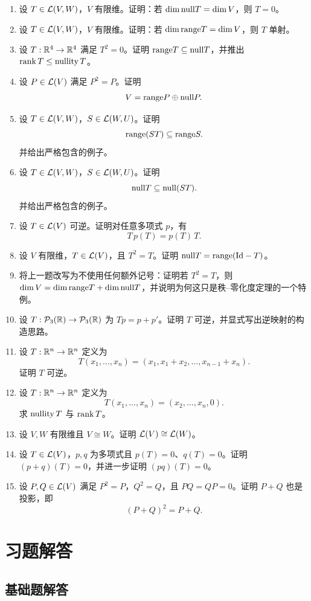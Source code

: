 \begin{enumerate}[label=\hard\ \arabic*., leftmargin=*, start=1] \item 设
$T\in\mathcal{L}(V,W)$，$V$ 有限维。证明：若 $\dim \mathrm{null} T=\dim V$，则 $T=0$。 \item 设 $T\in\mathcal{L}(V,W)$，$V$
有限维。证明：若 $\dim \mathrm{range} T=\dim V$，则 $T$ 单射。 \item 设 $T:\mathbb{R}^4\to\mathbb{R}^4$ 满足 $T^2=0$。证明 $\mathrm{range}
T\subseteq \mathrm{null} T$，并推出 $\operatorname{rank} T\leq \operatorname{nullity} T$。 \item 设 $P\in\mathcal{L}(V)$ 满足 $P^2=P$。证明 \[
V=\mathrm{range} P\oplus \mathrm{null} P. \] \item 设 $T\in\mathcal{L}(V,W)$，$S\in\mathcal{L}(W,U)$。证明 \[
\mathrm{range}(ST)\subseteq \mathrm{range} S. \] 并给出严格包含的例子。 \item 设
$T\in\mathcal{L}(V,W)$，$S\in\mathcal{L}(W,U)$。证明 \[ \mathrm{null} T\subseteq \mathrm{null}(ST). \] 并给出严格包含的例子。 \item 设
$T\in\mathcal{L}(V)$ 可逆。证明对任意多项式 $p$，有 \[ T\,p(T)=p(T)\,T. \] \item 设 $V$ 有限维，$T\in\mathcal{L}(V)$，且
$T^2=T$。证明 $\mathrm{null} T=\mathrm{range}(\mathrm{Id}-T)$。 \item 将上一题改写为不使用任何额外记号：证明若 $T^2=T$，则 $\dim V=\dim
\mathrm{range} T+\dim \mathrm{null} T$，并说明为何这只是秩--零化度定理的一个特例。 \item 设 $T:\mathcal{P}_3(\mathbb{R})\to\mathcal{P}_3(\mathbb{R})$ 为
$Tp=p+p'$。证明 $T$ 可逆，并显式写出逆映射的构造思路。 \item 设 $T:\mathbb{R}^n\to\mathbb{R}^n$ 定义为 \[
T(x_1,\dots,x_n)=(x_1,x_1+x_2,\dots,x_{n-1}+x_n). \] 证明 $T$ 可逆。 \item 设 $T:\mathbb{R}^n\to\mathbb{R}^n$
定义为 \[ T(x_1,\dots,x_n)=(x_2,\dots,x_n,0). \] 求 $\operatorname{nullity} T$ 与 $\operatorname{rank} T$。 \item 设 $V,W$
有限维且 $V\cong W$。证明 $\mathcal{L}(V)\cong \mathcal{L}(W)$。 \item 设 $T\in\mathcal{L}(V)$，$p,q$ 为多项式且
$p(T)=0$、$q(T)=0$。证明 $(p+q)(T)=0$，并进一步证明 $(pq)(T)=0$。 \item 设 $P,Q\in\mathcal{L}(V)$ 满足
$P^2=P$，$Q^2=Q$，且 $PQ=QP=0$。证明 $P+Q$ 也是投影，即 \[ (P+Q)^2=P+Q. \] \end{enumerate}

\section*{习题解答}

\subsection*{基础题解答}

